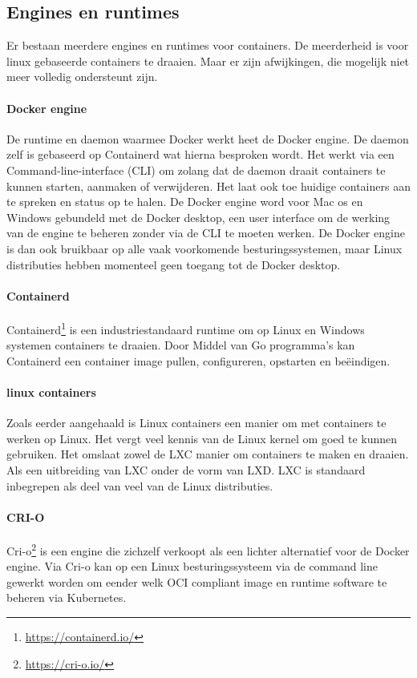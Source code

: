 \subsection{Engines en runtimes}
Er bestaan meerdere engines en runtimes voor containers. De meerderheid is voor linux gebaseerde containers te draaien. Maar er zijn afwijkingen, die mogelijk niet meer volledig ondersteunt zijn.

\paragraph{Docker engine}
De runtime en daemon waarmee Docker werkt heet de Docker engine. De daemon zelf is gebaseerd op Containerd wat hierna besproken wordt. Het werkt via een Command-line-interface (CLI) om zolang dat de daemon draait containers te kunnen starten, aanmaken of verwijderen. Het laat ook toe huidige containers aan te spreken en status op te halen. De Docker engine word voor Mac os en Windows gebundeld met de Docker desktop, een user interface om de werking van de engine te beheren zonder via de CLI  te moeten werken. De Docker engine is dan ook bruikbaar op alle vaak voorkomende besturingssystemen, maar Linux distributies hebben momenteel geen toegang tot de Docker desktop.
\paragraph{Containerd}
Containerd\footnote{\url{https://containerd.io/}} is een industriestandaard runtime om op Linux en Windows systemen containers te draaien. Door Middel van Go programma’s kan Containerd een container image pullen, configureren, opstarten en beëindigen.
\paragraph{linux containers}
Zoals eerder aangehaald is Linux containers een manier om met containers te werken op Linux. Het vergt veel kennis van de Linux kernel om goed te kunnen gebruiken.  Het omslaat zowel de LXC manier om containers te maken en draaien. Als een uitbreiding van LXC onder de vorm van LXD. LXC is standaard inbegrepen als deel van veel van de Linux distributies.  
\paragraph{CRI-O}
Cri-o\footnote{\url{https://cri-o.io/}} is een engine die zichzelf verkoopt als een lichter alternatief voor de Docker engine.  Via Cri-o kan op een Linux besturingssysteem via de command line gewerkt worden om eender welk OCI compliant image en runtime software te beheren via Kubernetes.
